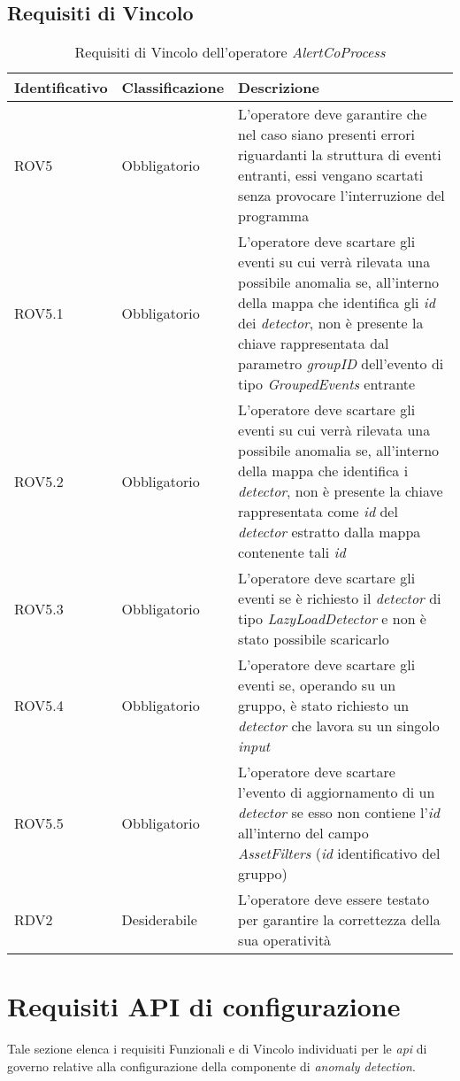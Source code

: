 \subsection{Requisiti di Vincolo}
{
\centering
\begin{longtable}{L{3cm} L{3cm} L{7.5cm}}
\caption{Requisiti di Vincolo dell'operatore \textit{AlertCoProcess}}\\
\textbf{Identificativo} &
\textbf{Classificazione}&
\textbf{Descrizione}\\
\endhead
\hline
ROV5 & Obbligatorio & L'operatore deve garantire che nel caso siano presenti errori riguardanti la struttura di eventi entranti, essi vengano scartati senza provocare l'interruzione del programma\\
\hline
ROV5.1 & Obbligatorio & L'operatore deve scartare gli eventi su cui verrà rilevata una possibile anomalia se, all'interno della mappa che identifica gli \textit{id} dei \textit{detector}, non è presente la chiave rappresentata dal parametro \textit{groupID} dell'evento di tipo \textit{GroupedEvents} entrante\\
\hline
ROV5.2 & Obbligatorio & L'operatore deve scartare gli eventi su cui verrà rilevata una possibile anomalia se, all'interno della mappa che identifica i \textit{detector}, non è presente la chiave rappresentata come \textit{id} del \textit{detector} estratto dalla mappa contenente tali \textit{id}\\
\hline
ROV5.3 & Obbligatorio & L'operatore deve scartare gli eventi se è richiesto il \textit{detector} di tipo \textit{LazyLoadDetector} e non è stato possibile scaricarlo\\
\hline
ROV5.4 & Obbligatorio & L'operatore deve scartare gli eventi se, operando su un gruppo, è stato richiesto un \textit{detector} che lavora su un singolo \textit{input}\\
\hline
ROV5.5 & Obbligatorio & L'operatore deve scartare l'evento di aggiornamento di un \textit{detector} se esso non contiene l'\textit{id} all'interno del campo \textit{AssetFilters} (\textit{id} identificativo del gruppo)\\
\hline
RDV2 & Desiderabile & L'operatore deve essere testato per garantire la correttezza della sua operatività\\
\hline
\end{longtable}
}

\section{Requisiti API di configurazione}
Tale sezione elenca i requisiti Funzionali e di Vincolo individuati per le \textit{\gls{api}} di governo relative alla configurazione della componente di \textit{anomaly detection}.
